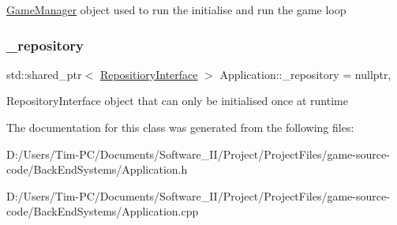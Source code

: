 \hyperlink{class_game_manager}{Game\+Manager} object used to run the initialise and run the game loop \mbox{\label{class_application_af7e1a832b2f8dbc3a283cb29f7a89c01}} 
\subsubsection{\texorpdfstring{\+\_\+repository}{\_repository}}
{\footnotesize\ttfamily std\+::shared\+\_\+ptr$<$ \hyperlink{class_repositiory_interface}{Repositiory\+Interface} $>$ Application\+::\+\_\+repository = nullptr\hspace{0.3cm}{\ttfamily [static]}, {\ttfamily [private]}}

Repository\+Interface object that can only be initialised once at runtime 

The documentation for this class was generated from the following files\+:\begin{DoxyCompactItemize}
\item 
D\+:/\+Users/\+Tim-\/\+P\+C/\+Documents/\+Software\+\_\+\+I\+I/\+Project/\+Project\+Files/game-\/source-\/code/\+Back\+End\+Systems/Application.\+h\item 
D\+:/\+Users/\+Tim-\/\+P\+C/\+Documents/\+Software\+\_\+\+I\+I/\+Project/\+Project\+Files/game-\/source-\/code/\+Back\+End\+Systems/Application.\+cpp\end{DoxyCompactItemize}
